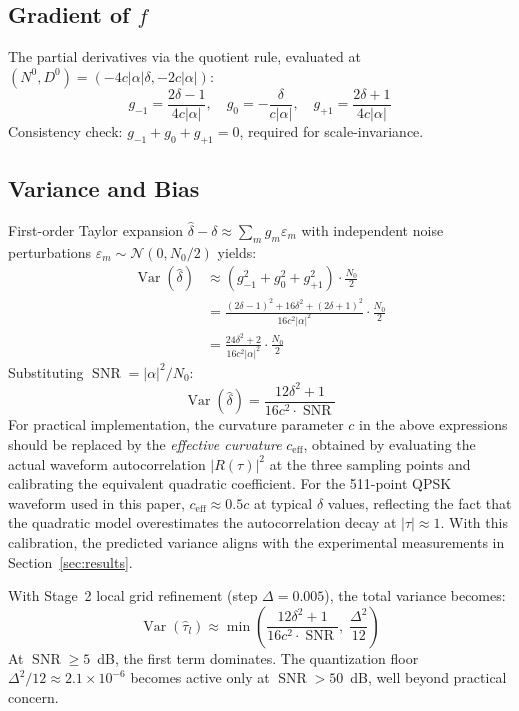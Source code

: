 \documentclass[a4paper,fleqn]{cas-dc}
\DeclareMathOperator{\Var}{Var}
\DeclareMathOperator{\SNR}{SNR}
\newcommand{\Nc}{\mathcal{N}}
\begin{document}
\subsection{Gradient of \texorpdfstring{$f$}{f}}

The partial derivatives via the quotient rule, evaluated at $(N^0, D^0) = (-4c|\alpha|\delta, -2c|\alpha|)$:
\begin{equation}
g_{-1} = \frac{2\delta - 1}{4c|\alpha|}, \quad
g_0    = -\frac{\delta}{c|\alpha|}, \quad
g_{+1} = \frac{2\delta + 1}{4c|\alpha|}
\label{eq:A4}
\end{equation}
Consistency check: $g_{-1} + g_0 + g_{+1} = 0$, required for scale-invariance.

\subsection{Variance and Bias}

First-order Taylor expansion $\hat{\delta} - \delta \approx \sum_m g_m \varepsilon_m$ with independent noise perturbations $\varepsilon_m \sim \Nc(0, N_0/2)$ yields:
\begin{align}
\Var(\hat{\delta}) &\approx (g_{-1}^2 + g_0^2 + g_{+1}^2) \cdot \frac{N_0}{2} \nonumber\\
&= \frac{(2\delta-1)^2 + 16\delta^2 + (2\delta+1)^2}{16c^2|\alpha|^2} \cdot \frac{N_0}{2} \nonumber\\
&= \frac{24\delta^2 + 2}{16c^2|\alpha|^2} \cdot \frac{N_0}{2}
\label{eq:A6}
\end{align}
Substituting $\SNR = |\alpha|^2/N_0$:
\begin{equation}
\Var(\hat{\delta}) = \frac{12\delta^2 + 1}{16c^2 \cdot \SNR}
\label{eq:A7}
\end{equation}
For practical implementation, the curvature parameter $c$ in the above expressions should be replaced by the \emph{effective curvature} $c_{\text{eff}}$, obtained by evaluating the actual waveform autocorrelation $|R(\tau)|^2$ at the three sampling points and calibrating the equivalent quadratic coefficient. For the 511-point QPSK waveform used in this paper, $c_{\text{eff}} \approx 0.5c$ at typical $\delta$ values, reflecting the fact that the quadratic model overestimates the autocorrelation decay at $|\tau|\approx 1$. With this calibration, the predicted variance aligns with the experimental measurements in Section~\ref{sec:results}.

With Stage~2 local grid refinement (step $\Delta = 0.005$), the total variance becomes:
\begin{equation}
\Var(\hat{\tau}_l) \approx \min\!\left( \frac{12\delta^2 + 1}{16c^2 \cdot \SNR}, \; \frac{\Delta^2}{12} \right)
\label{eq:A9}
\end{equation}
At $\SNR \ge 5$~dB, the first term dominates. The quantization floor $\Delta^2/12 \approx 2.1 \times 10^{-6}$ becomes active only at $\SNR > 50$~dB, well beyond practical concern.
\end{document}

